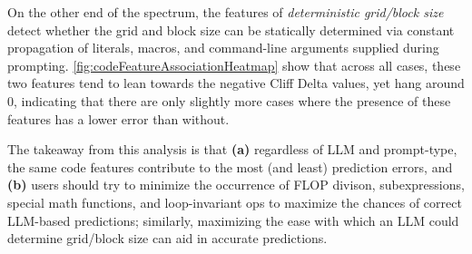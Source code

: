 On the other end of the spectrum, the features of \textit{deterministic grid/block size} detect whether the grid and block size can be statically determined via constant propagation of literals, macros, and command-line arguments supplied during prompting.
\autoref{fig:codeFeatureAssociationHeatmap} show that across all cases, these two features tend to lean towards the negative Cliff Delta values, yet hang around 0, indicating that there are only slightly more cases where the presence of these features has a lower \rai error than without.

The takeaway from this analysis is that \textbf{(a)} regardless of LLM and prompt-type, the same code features contribute to the most (and least) \rai prediction errors, and \textbf{(b)} users should try to minimize the occurrence of FLOP divison, subexpressions, special math functions, and loop-invariant ops to maximize the chances of correct LLM-based \rai predictions; similarly, maximizing the ease with which an LLM could determine grid/block size can aid in accurate predictions.


